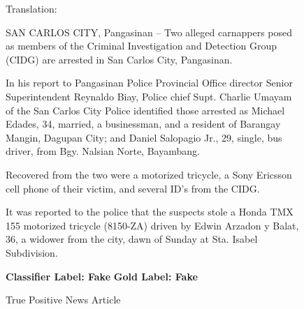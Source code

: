 \begin{figure}[h!]
{{                          Translation:\newline \newline
                          \small \raggedright SAN CARLOS CITY, Pangasinan – Two alleged carnappers posed as members of the Criminal Investigation and Detection Group (CIDG) are arrested in San Carlos City, Pangasinan. \linebreak

                          \small \raggedright In his report to Pangasinan Police Provincial Office director Senior Superintendent Reynaldo Biay, Police chief Supt. Charlie Umayam of the San Carlos City Police identified those arrested as Michael Edades, 34, married, a businessman, and a resident of Barangay Mangin, Dagupan City; and Daniel Salopagio Jr., 29, single, bus driver, from Bgy. Nalsian Norte, Bayambang.\linebreak

                          \small \raggedright Recovered from the two were a motorized tricycle, a Sony Ericsson cell phone of their victim, and several ID's from the CIDG. \linebreak

                          \small \raggedright It was reported to the police that the suspects stole a Honda TMX 155 motorized tricycle (8150-ZA) driven by Edwin Arzadon y Balat, 36, a widower from the city, dawn of Sunday at Sta. Isabel Subdivision. \linebreak

                          \textbf{Classifier Label: Fake} \newline
                          \textbf{Gold Label: Fake}

                            }
                        }

                         \caption{True Positive News Article}
                            \label{fig:true-positive-news-article}
                        \end{figure}

